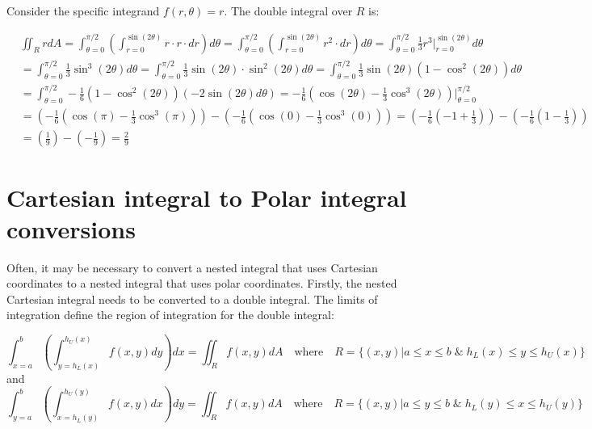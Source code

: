 \documentclass{article}
\begin{document}
Consider the specific integrand \(f(r,\theta) = r\). The double integral over \(R\) is:

\begin{align*} 
& \iint_R r dA 
= \int_{\theta = 0}^{\pi/2} \left(\int_{r = 0}^{\sin(2\theta)} r \cdot r \cdot dr\right)d\theta  
= \int_{\theta = 0}^{\pi/2} \left(\int_{r = 0}^{\sin(2\theta)} r^2 \cdot dr\right)d\theta 
= \int_{\theta = 0}^{\pi/2} \frac{1}{3}r^3 \Big|_{r = 0}^{\sin(2\theta)} d\theta \\
& = \int_{\theta = 0}^{\pi/2} \frac{1}{3}\sin^3(2\theta) d\theta 
= \int_{\theta = 0}^{\pi/2} \frac{1}{3}\sin(2\theta) \cdot \sin^2(2\theta) d\theta 
= \int_{\theta = 0}^{\pi/2} \frac{1}{3}\sin(2\theta)(1 - \cos^2(2\theta)) d\theta \\
& = \int_{\theta = 0}^{\pi/2} -\frac{1}{6}(1 - \cos^2(2\theta)) (-2\sin(2\theta)d\theta) 
= -\frac{1}{6}(\cos(2\theta) - \frac{1}{3}\cos^3(2\theta))\Big|_{\theta = 0}^{\pi/2} \\
& = (-\frac{1}{6}(\cos(\pi) - \frac{1}{3}\cos^3(\pi))) - (-\frac{1}{6}(\cos(0) - \frac{1}{3}\cos^3(0))) 
= (-\frac{1}{6}(-1 + \frac{1}{3})) - (-\frac{1}{6}(1 - \frac{1}{3})) \\
& = (\frac{1}{9}) - (-\frac{1}{9}) 
= \frac{2}{9}
\end{align*}





\section*{Cartesian integral to Polar integral conversions} 

Often, it may be necessary to convert a nested integral that uses Cartesian coordinates to a nested integral that uses polar coordinates. Firstly, the nested Cartesian integral needs to be converted to a double integral. The limits of integration define the region of integration for the double integral:

\[\int_{x = a}^b \left(\int_{y = h_L(x)}^{h_U(x)} f(x,y)dy\right)dx = \iint_R f(x,y)dA \quad\text{where}\quad R = \{(x,y) | a \leq x \leq b \;\&\; h_L(x) \leq y \leq h_U(x)\}\] 
and 
\[\int_{y = a}^b \left(\int_{x = h_L(y)}^{h_U(y)} f(x,y)dx\right)dy = \iint_R f(x,y)dA \quad\text{where}\quad R = \{(x,y) | a \leq y \leq b \;\&\; h_L(y) \leq x \leq h_U(y)\}\]
\end{document}

